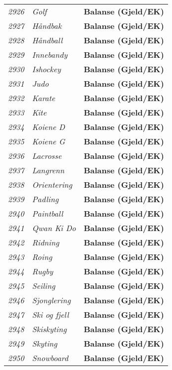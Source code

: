 \begin{longtable}{l l l}
\emph{2926} & \emph{Golf} & {\bfseries Balanse (Gjeld/EK)}\\
\emph{2927} & \emph{Håndbak} & {\bfseries Balanse (Gjeld/EK)}\\
\emph{2928} & \emph{Håndball} & {\bfseries Balanse (Gjeld/EK)}\\
\emph{2929} & \emph{Innebandy} & {\bfseries Balanse (Gjeld/EK)}\\
\emph{2930} & \emph{Ishockey} & {\bfseries Balanse (Gjeld/EK)}\\
\emph{2931} & \emph{Judo} & {\bfseries Balanse (Gjeld/EK)}\\
\emph{2932} & \emph{Karate} & {\bfseries Balanse (Gjeld/EK)}\\
\emph{2933} & \emph{Kite} & {\bfseries Balanse (Gjeld/EK)}\\
\emph{2934} & \emph{Koiene D} & {\bfseries Balanse (Gjeld/EK)}\\
\emph{2935} & \emph{Koiene G} & {\bfseries Balanse (Gjeld/EK)}\\
\emph{2936} & \emph{Lacrosse} & {\bfseries Balanse (Gjeld/EK)}\\
\emph{2937} & \emph{Langrenn} & {\bfseries Balanse (Gjeld/EK)}\\
\emph{2938} & \emph{Orientering} & {\bfseries Balanse (Gjeld/EK)}\\
\emph{2939} & \emph{Padling} & {\bfseries Balanse (Gjeld/EK)}\\
\emph{2940} & \emph{Paintball} & {\bfseries Balanse (Gjeld/EK)}\\
\emph{2941} & \emph{Qwan Ki Do} & {\bfseries Balanse (Gjeld/EK)}\\
\emph{2942} & \emph{Ridning} & {\bfseries Balanse (Gjeld/EK)}\\
\emph{2943} & \emph{Roing} & {\bfseries Balanse (Gjeld/EK)}\\
\emph{2944} & \emph{Rugby} & {\bfseries Balanse (Gjeld/EK)}\\
\emph{2945} & \emph{Seiling} & {\bfseries Balanse (Gjeld/EK)}\\
\emph{2946} & \emph{Sjonglering} & {\bfseries Balanse (Gjeld/EK)}\\
\emph{2947} & \emph{Ski og fjell} & {\bfseries Balanse (Gjeld/EK)}\\
\emph{2948} & \emph{Skiskyting} & {\bfseries Balanse (Gjeld/EK)}\\
\emph{2949} & \emph{Skyting} & {\bfseries Balanse (Gjeld/EK)}\\
\emph{2950} & \emph{Snowboard} & {\bfseries Balanse (Gjeld/EK)}\\

\end{longtable}
